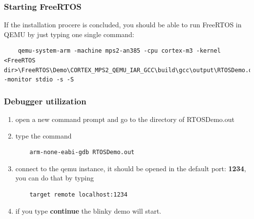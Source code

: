 \documentclass{exam}
\begin{document}
\subsubsection{Starting FreeRTOS}
If the installation procere is concluded, you should be able to run FreeRTOS in QEMU by just typing one single command:
\begin{lstlisting}
    qemu-system-arm -machine mps2-an385 -cpu cortex-m3 -kernel <FreeRTOS dir>\FreeRTOS\Demo\CORTEX_MPS2_QEMU_IAR_GCC\build\gcc\output\RTOSDemo.out -monitor stdio -s -S
\end{lstlisting}


\subsubsection{Debugger utilization}
    \begin{enumerate}
        \item open a new command prompt and go to the directory of RTOSDemo.out
        \item type the command 
\begin{lstlisting}
    arm-none-eabi-gdb RTOSDemo.out
\end{lstlisting}
        \item connect to the qemu instance, it should be opened in the default port: \textbf{1234}, you can do that by typing 
\begin{lstlisting}
    target remote localhost:1234
\end{lstlisting}
        \item if you type \textbf{continue} the blinky demo will start.
    \end{enumerate}
\end{document}

